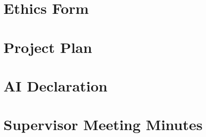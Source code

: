 \documentclass[12pt,a4paper]{article}
\begin{document}
\begin{appendices}
    \section{Ethics Form}
    
    \section{Project Plan}
    
    \section{AI Declaration}
    
    \section{Supervisor Meeting Minutes}
\end{appendices}
\end{document}
